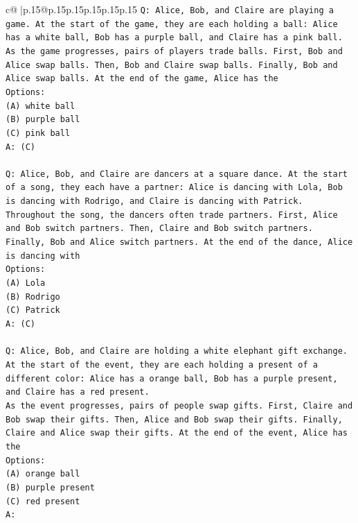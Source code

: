 \documentclass{article}
\begin{document}
{\begin{supertabular}{c@{$\;$}|p{.15\linewidth}@{}p{.15\linewidth}p{.15\linewidth}p{.15\linewidth}p{.15\linewidth}p{.15\linewidth}}
{{{\texttt{Q: Alice, Bob, and Claire are playing a game. At the start of the game, they are each holding a ball: Alice has a white ball, Bob has a purple ball, and Claire has a pink ball.} \\
\texttt{As the game progresses, pairs of players trade balls. First, Bob and Alice swap balls. Then, Bob and Claire swap balls. Finally, Bob and Alice swap balls. At the end of the game, Alice has the} \\
\texttt{Options:} \\
\texttt{(A) white ball} \\
\texttt{(B) purple ball} \\
\texttt{(C) pink ball} \\
\texttt{A: (C)} \\
\\ 
\texttt{Q: Alice, Bob, and Claire are dancers at a square dance. At the start of a song, they each have a partner: Alice is dancing with Lola, Bob is dancing with Rodrigo, and Claire is dancing with Patrick.} \\
\texttt{Throughout the song, the dancers often trade partners. First, Alice and Bob switch partners. Then, Claire and Bob switch partners. Finally, Bob and Alice switch partners. At the end of the dance, Alice is dancing with} \\
\texttt{Options:} \\
\texttt{(A) Lola} \\
\texttt{(B) Rodrigo} \\
\texttt{(C) Patrick} \\
\texttt{A: (C)} \\
\\ 
\texttt{Q: Alice, Bob, and Claire are holding a white elephant gift exchange. At the start of the event, they are each holding a present of a different color: Alice has a orange ball, Bob has a purple present, and Claire has a red present.} \\
\texttt{As the event progresses, pairs of people swap gifts. First, Claire and Bob swap their gifts. Then, Alice and Bob swap their gifts. Finally, Claire and Alice swap their gifts. At the end of the event, Alice has the} \\
\texttt{Options:} \\
\texttt{(A) orange ball} \\
\texttt{(B) purple present} \\
\texttt{(C) red present} \\
\texttt{A:} \\
            }
        }
    }
     \\ \\


\end{supertabular}}
\end{document}
